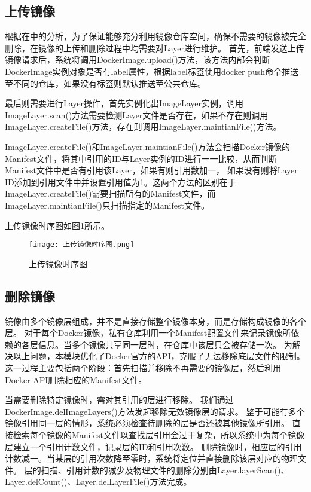 \subsection{上传镜像}
根据在中的分析，为了保证能够充分利用镜像仓库空间，确保不需要的镜像被完全删除，在镜像的上传和删除过程中均需要对Layer进行维护。
首先，前端发送上传镜像请求后，系统将调用DockerImage.upload()方法，该方法内部会判断DockerImage实例对象是否有label属性，根据label标签使用docker push命令推送至不同的仓库，如果没有标签则默认推送至公共仓库。

最后则需要进行Layer操作，首先实例化出ImageLayer实例，调用ImageLayer.scan()方法需要检测Layer文件是否存在，如果不存在则调用ImageLayer.createFile()方法，存在则调用ImageLayer.maintianFile()方法。

ImageLayer.createFile()和ImageLayer.maintianFile()方法会扫描Docker镜像的Manifest文件，将其中引用的ID与Layer实例的ID进行一一比较，从而判断Manifest文件中是否有引用该Layer，如果有则引用数加一，
如果没有则将Layer ID添加到引用文件中并设置引用值为1。这两个方法的区别在于ImageLayer.createFile()需要扫描所有的Manifest文件，而ImageLayer.maintianFile()只扫描指定的Manifest文件。

上传镜像时序图如图\ref{fig:上传镜像时序图}所示。

\begin{figure}[h]
  \centering
  \texttt{[image: 上传镜像时序图.png]}
  \caption{上传镜像时序图}
  \label{fig:上传镜像时序图}
\end{figure}

\subsection{删除镜像}
镜像由多个镜像层组成，并不是直接存储整个镜像本身，而是存储构成镜像的各个层。
对于每个Docker镜像，私有仓库利用一个Manifest配置文件来记录镜像所依赖的各层信息。当多个镜像共享同一层时，在仓库中该层只会被存储一次。
为解决以上问题，本模块优化了Docker官方的API，克服了无法移除底层文件的限制。这一过程主要包括两个阶段：首先扫描并移除不再需要的镜像层，然后利用Docker API删除相应的Manifest文件。

当需要删除特定镜像时，需对其引用的层进行移除。
我们通过DockerImage.delImageLayers()方法发起移除无效镜像层的请求。
鉴于可能有多个镜像引用同一层的情形，系统必须检查待删除的层是否还被其他镜像所引用。
直接检索每个镜像的Manifest文件以查找层引用会过于复杂，所以系统中为每个镜像层建立一个引用计数文件，记录层的ID和引用次数。
删除镜像时，相应层的引用计数减一。当某层的引用次数降至零时，系统将定位并直接删除该层对应的物理文件。
层的扫描、引用计数的减少及物理文件的删除分别由Layer.layerScan()、Layer.delCount()、Layer.delLayerFile()方法完成。

